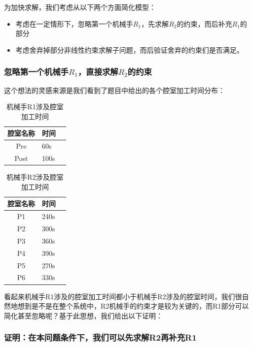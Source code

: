 \documentclass{ctexart}
\begin{document}
{{	为加快求解，我们考虑从以下两个方面简化模型：
	
	\begin{itemize}
		\item 考虑在一定情形下，忽略第一个机械手$R_1$，先求解$R_2$的约束，而后补充$R_1$的部分
		\item 考虑舍弃掉部分非线性约束求解子问题，而后验证舍弃的约束们是否满足。
	\end{itemize}
	
	\subsubsection{忽略第一个机械手$R_1$，直接求解$R_2$的约束}
	
	这个想法的灵感来源是我们看到了题目中给出的各个腔室加工时间分布：
	
	\begin{table}[H]
		\centering
		\caption{机械手R1涉及腔室加工时间}
		\begin{tabular}{@{}clc@{}}
			\toprule
			腔室名称 & 时间 \\ \midrule
			Pre & 60s \\
			Post & 100s  \\ \bottomrule
		\end{tabular}
	\end{table}
	
	\begin{table}[H]
		\centering
		\caption{机械手R2涉及腔室加工时间}
		\begin{tabular}{@{}clc@{}}
			\toprule
			腔室名称 & 时间 \\ \midrule
			P1 & 240s \\
			P2 & 300s \\
			P3 & 360s \\
			P4 & 390s \\
			P5 & 270s \\
			P6 & 330s  \\ \bottomrule
		\end{tabular}
	\end{table}

	看起来机械手R1涉及的腔室加工时间都小于机械手R2涉及的腔室时间，我们很自然地想到是不是在整个系统中，R2机械手的约束才是较为关键的，而R1部分可以简化甚至忽略呢？基于此思想，我们给出以下证明：
	
	\subsubsection*{证明：在本问题条件下，我们可以先求解R2再补充R1}
	
}}
\end{document}
